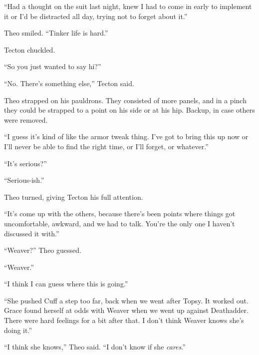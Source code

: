 ``Had a thought on the suit last night, knew I had to come in early to implement it or I'd be distracted all day, trying not to forget about it.''



Theo smiled.  ``Tinker life is hard.''



Tecton chuckled.



``So you just wanted to say hi?''



``No.  There's something else,'' Tecton said.



Theo strapped on his pauldrons.  They consisted of more panels, and in a pinch they could be strapped to a point on his side or at his hip.  Backup, in case others were removed.



``I guess it's kind of like the armor tweak thing.  I've got to bring this up now or I'll never be able to find the right time, or I'll forget, or whatever.''



``It's serious?''



``Serious-ish.''



Theo turned, giving Tecton his full attention.



``It's come up with the others, because there's been points where things got uncomfortable, awkward, and we had to talk.  You're the only one I haven't discussed it with.''



``Weaver?'' Theo guessed.



``Weaver.''



``I think I can guess where this is going.''



``She pushed Cuff a step too far, back when we went after Topsy.  It worked out.  Grace found herself at odds with Weaver when we went up against Deathadder.  There were hard feelings for a bit after that.  I don't think Weaver knows she's doing it.''



``I think she knows,'' Theo said.  ``I don't know if she \emph{cares}.''



